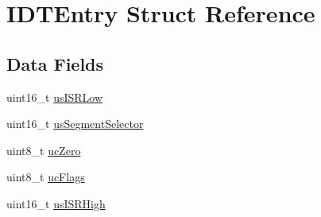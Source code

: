 \hypertarget{structIDTEntry}{\section{I\-D\-T\-Entry Struct Reference}
\label{structIDTEntry}
}
\subsection*{Data Fields}
\begin{DoxyCompactItemize}
\item 
uint16\-\_\-t \hyperlink{structIDTEntry_a697339bc290ebc873b65697756b23d1f}{us\-I\-S\-R\-Low}
\item 
uint16\-\_\-t \hyperlink{structIDTEntry_a6f409962007e9536b0fb17608918359e}{us\-Segment\-Selector}
\item 
uint8\-\_\-t \hyperlink{structIDTEntry_a135bfe3f884d81face00fbef7440c957}{uc\-Zero}
\item 
uint8\-\_\-t \hyperlink{structIDTEntry_abf8d8ca4d1da518ad0ec4d34a68c8abf}{uc\-Flags}
\item 
uint16\-\_\-t \hyperlink{structIDTEntry_a6e0e6884bb02831eb83cc06c101d8c57}{us\-I\-S\-R\-High}
\end{DoxyCompactItemize}


